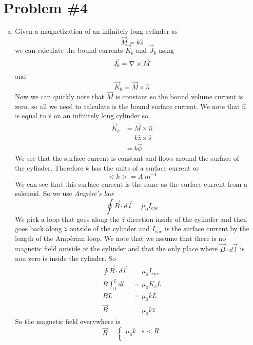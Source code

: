 \documentclass[11pt]{article}
\numberwithin{equation}{section}
\newcommand{\grad}{\bold\nabla}
\begin{document}
\section{Problem \#4}
\begin{enumerate}[(a)]
\item
Given a magnetization of an infinitely long cylinder as 
$$\vec{M} = k\hat{z}$$
we can calculate the bound currents $\vec{K}_b$ and $\vec{J}_b$ using
\begin{equation}
\vec{J}_b = \grad\times\vec{M}
\label{Jbond}
\end{equation}
and
\begin{equation}
\vec{K}_b = \vec{M}\times\hat{n}
\label{Kbond}
\end{equation}
Now we can quickly note that $\vec{M}$ is constant so the bound volume current is zero, so all we need to calculate is the bound surface current. We note that $\hat{n}$ is equal to $\hat{s}$ on an infinitely long cylinder so
\begin{align*}
\vec{K}_b &= \vec{M}\times\hat{n}\\
&= k\hat{z}\times\hat{s}\\
&= k\hat{\phi}
\end{align*}
We see that the surface current is constant and flows around the surface of the cylinder. Therefore $k$ has the units of a surface current or
$$<k> = A\ m^{-1}$$
We can see that this surface current is the same as the surface current from a solenoid. So we use \emph{Amp\`{e}re's law} 
\begin{equation}
\oint\vec{B}\cdot d\vec{l} = \mu_0 I_{enc}
\label{amplaw}
\end{equation}
We pick a loop that goes along the $\hat{z}$ direction inside of the cylinder and then goes back along $\hat{z}$ outside of the cylinder and $I_{enc}$ is the surface current by the length of the Amp\`{e}rian loop. We note that we assume that there is no magnetic field outside of the cylinder and that the only place where $\vec{B}\cdot d\vec{l}$ is non zero is inside the cylinder. So
\begin{align*}
\oint\vec{B}\cdot d\vec{l} &= \mu_0 I_{enc}\\
B\int_0^L dl &= \mu_0 {K_b}{L}\\
BL &= \mu_0 {k}{L}\\
\vec{B} &= \mu_0 k\hat{z}
\end{align*}
So the magnetic field everywhere is 
$$\vec{B} = \left\{\begin{array}{lc}
	\mu_0 k		&s<R\\

\end{array}$$
\end{enumerate}
\end{document}
